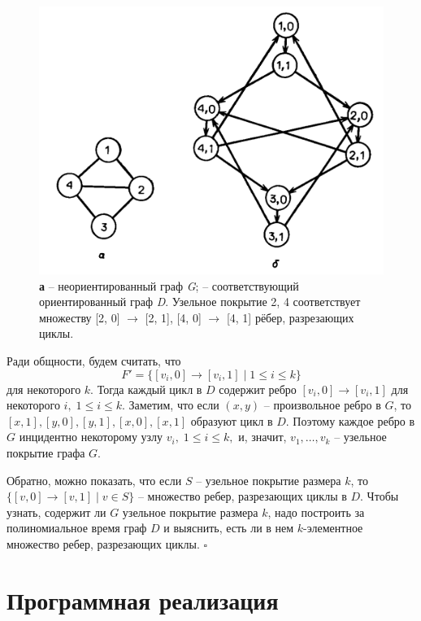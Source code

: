 \documentclass[spec, och, otchet, hidelinks]{SCWorks}
\begin{document}
\begin{figure}[h]
	\includegraphics[scale=0.9]{graphs.png}
	\caption{\textbf{а} -- неориентированный граф \textit{G}; \textbf{} -- соответствующий ориентированный граф \textit{D}. Узельное покрытие 
	{2, 4} соответствует множеству {[2, 0] $\rightarrow$ [2, 1], [4, 0] $\rightarrow$ [4, 1]} рёбер, разрезающих циклы.}
\end{figure}

\newpage

Ради общности, будем считать, что
$$F' = \{[v_i, 0] \rightarrow [v_i, 1] \; | \; 1 \leq i \leq k \} $$
для некоторого $k$. Тогда каждый цикл в $D$ содержит ребро $[v_i, 0] \rightarrow [v_i, 1]$ для некоторого $i, \; 1 \leq i \leq k$. Заметим, что если 
$(x, y)$ -- произвольное ребро в $G$, то $[x, 1], [y, 0], [y, 1], [x, 0], [x, 1]$ образуют цикл в $D$. Поэтому каждое ребро в $G$ инцидентно некоторому
узлу $v_i, \; 1 \leq i \leq k,$ и, значит, ${v_1, \dots, v_k}$ -- узельное покрытие графа $G$.

\par Обратно, можно показать, что если $S$ -- узельное покрытие размера $k$, то $\{[v, 0] \rightarrow [v, 1] \; | \; v \in S\}$ -- множество ребер, 
разрезаю­щих циклы в $D$. Чтобы узнать, содержит ли $G$ узельное покрытие размера $k$, надо построить за полиномиальное время граф $D$ и выяснить, 
есть ли в нем $k$-элементное множество ребер, разрезающих циклы. $\square$

\newpage

\section*{Программная реализация}
\end{document}
